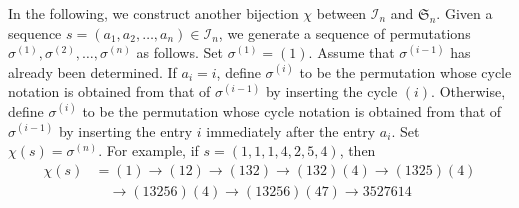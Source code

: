 \documentclass[12pt]{article}
\numberwithin{equation}{section}
\theoremstyle{plain}
\begin{document}
    
     In the following, we construct another bijection $\chi$ between $\mathcal{I}_n$ and $\mathfrak{S}_n$. Given a sequence $s=(a_1,a_2,\dots,a_n)\in \mathcal{I}_n$, we generate a sequence of permutations $\sigma^{(1)}, \sigma^{(2)}, \ldots,\sigma^{(n)}$ as follows. Set $\sigma^{(1)}=(1)$. Assume that $\sigma^{(i-1)}$ has already been determined. If $a_i = i$, define $\sigma^{(i)}$ to be the permutation whose cycle notation is obtained from that of $\sigma^{(i-1)}$ by inserting the cycle $(i)$. Otherwise,  define $\sigma^{(i)}$ to be the permutation whose cycle notation is  obtained from that of $\sigma^{(i-1)}$ by inserting the entry $i$ immediately after the entry $a_i$. Set  $\chi(s)=\sigma^{(n)}$. For example, if $s=(1,1,1,4,2,5, 4)$, then\begin{align*}
     	\chi(s)&=   (1)\rightarrow (12)\rightarrow (132) \rightarrow (132)(4)\rightarrow (1325)(4)\\
     	&\quad\rightarrow  (13256)(4) \rightarrow (13256)(47)\rightarrow 3527614
     \end{align*}
     
\end{document}
